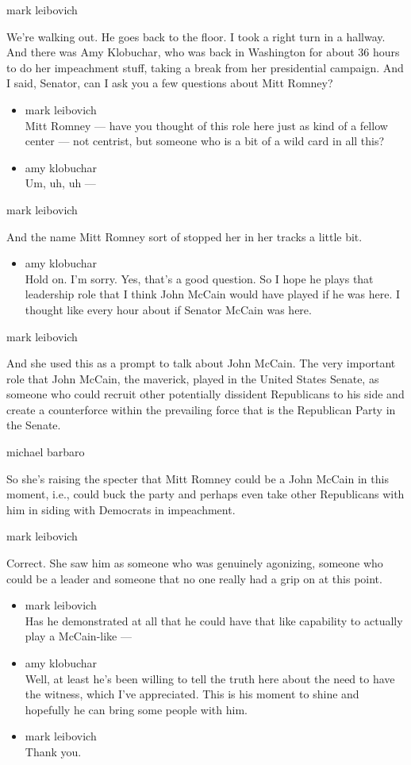 mark leibovich

We're walking out. He goes back to the floor. I took a right turn in a
hallway. And there was Amy Klobuchar, who was back in Washington for
about 36 hours to do her impeachment stuff, taking a break from her
presidential campaign. And I said, Senator, can I ask you a few
questions about Mitt Romney?

\begin{itemize}
\item
  mark leibovich\\
  Mitt Romney --- have you thought of this role here just as kind of a
  fellow center --- not centrist, but someone who is a bit of a wild
  card in all this?
\item
  amy klobuchar\\
  Um, uh, uh ---
\end{itemize}

mark leibovich

And the name Mitt Romney sort of stopped her in her tracks a little bit.

\begin{itemize}
\tightlist
\item
  amy klobuchar\\
  Hold on. I'm sorry. Yes, that's a good question. So I hope he plays
  that leadership role that I think John McCain would have played if he
  was here. I thought like every hour about if Senator McCain was here.
\end{itemize}

mark leibovich

And she used this as a prompt to talk about John McCain. The very
important role that John McCain, the maverick, played in the United
States Senate, as someone who could recruit other potentially dissident
Republicans to his side and create a counterforce within the prevailing
force that is the Republican Party in the Senate.

michael barbaro

So she's raising the specter that Mitt Romney could be a John McCain in
this moment, i.e., could buck the party and perhaps even take other
Republicans with him in siding with Democrats in impeachment.

mark leibovich

Correct. She saw him as someone who was genuinely agonizing, someone who
could be a leader and someone that no one really had a grip on at this
point.

\begin{itemize}
\item
  mark leibovich\\
  Has he demonstrated at all that he could have that like capability to
  actually play a McCain-like ---
\item
  amy klobuchar\\
  Well, at least he's been willing to tell the truth here about the need
  to have the witness, which I've appreciated. This is his moment to
  shine and hopefully he can bring some people with him.
\item
  mark leibovich\\
  Thank you.
\end{itemize}


